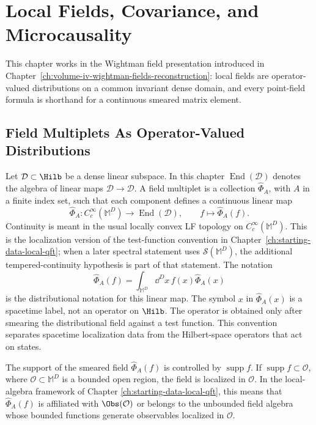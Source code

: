 \chapter{Local Fields, Covariance, and Microcausality}
\label{ch:local-fields-covariance-microcausality}
\ConventionsLorentzian


This chapter works in the Wightman field presentation introduced in
Chapter~\ref{ch:volume-iv-wightman-fields-reconstruction}: local fields are
operator-valued distributions on a common invariant dense domain, and every
point-field formula is shorthand for a continuous smeared matrix element.

\section{Field Multiplets As Operator-Valued Distributions}

\begin{definition}
\label{def:field-multiplet-operator-valued-distribution}
Let \(\mathcal D\subset\Hilb\) be a dense linear subspace. In this chapter
\(\operatorname{End}(\mathcal D)\) denotes the algebra of linear maps
\(\mathcal D\to\mathcal D\). A field multiplet is a collection
\(\widehat\Phi_A\), with \(A\) in a finite index set, such that each component
defines a continuous linear map
\[
  \widehat\Phi_A:C_c^\infty(\mathbb M^D)\to\operatorname{End}(\mathcal D),
  \qquad
  f\mapsto\widehat\Phi_A(f).
\]
Continuity is meant in the usual locally convex LF topology on
\(C_c^\infty(\mathbb M^D)\). This is the localization version of the
test-function convention in Chapter~\ref{ch:starting-data-local-qft}; when a
later spectral statement uses \(\mathcal S(\mathbb M^D)\), the additional
tempered-continuity hypothesis is part of that statement. The notation
\[
  \widehat\Phi_A(f)
  =
  \int_{\mathbb M^D}\dd^Dx\,f(x)\widehat\Phi_A(x)
\]
is the distributional notation for this linear map.
The symbol \(x\) in \(\widehat\Phi_A(x)\) is a spacetime label, not an
operator on \(\Hilb\).  The operator is obtained only after smearing the
distributional field against a test function.  This convention separates
spacetime localization data from the Hilbert-space operators that act on
states.
\end{definition}

\begin{definition}
\label{def:localized-smeared-field}
The support of the smeared field \(\widehat\Phi_A(f)\) is controlled by
\(\operatorname{supp}f\). If \(\operatorname{supp}f\subset\mathcal O\), where
\(\mathcal O\subset\mathbb M^D\) is a bounded open region, the field is
localized in \(\mathcal O\). In the local-algebra framework of Chapter
\ref{ch:starting-data-local-qft}, this means that \(\widehat\Phi_A(f)\) is
affiliated with \(\Obs(\mathcal O)\) or belongs to the unbounded field algebra
whose bounded functions generate observables localized in \(\mathcal O\).
\end{definition}

